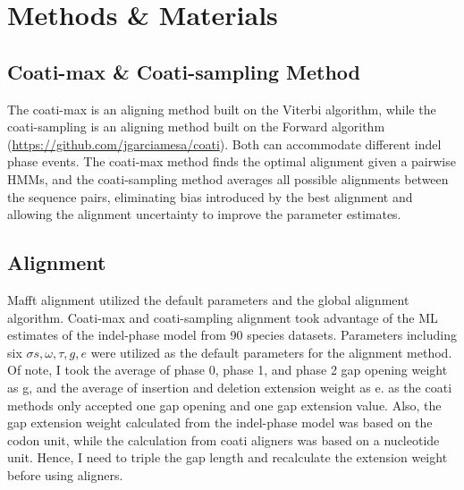 \section{Methods \& Materials}
\subsection{Coati-max \& Coati-sampling Method}
The coati-max is an aligning method built on the Viterbi algorithm, while the coati-sampling is an aligning method built on the Forward algorithm (\href{https://github.com/jgarciamesa/coati}{https://github.com/jgarciamesa/coati}). Both can accommodate different indel phase events. The coati-max method finds the optimal alignment given a pairwise HMMs, and the coati-sampling method averages all possible alignments between the sequence pairs, eliminating bias introduced by the best alignment and allowing the alignment uncertainty to improve the parameter estimates.  

\subsection{Alignment}
Mafft alignment utilized the default parameters and the global alignment algorithm. Coati-max and coati-sampling alignment took advantage of the ML estimates of the indel-phase model from 90 species datasets. Parameters including six $\sigma s, \omega, \tau, g, e$ were utilized as the default parameters for the alignment method. Of note, I took the average of phase 0, phase 1, and phase 2 gap opening weight as g, and the average of insertion and deletion extension weight as e. as the coati methods only accepted one gap opening and one gap extension value. Also, the gap extension weight calculated from the indel-phase model was based on the codon unit, while the calculation from coati aligners was based on a nucleotide unit. Hence, I need to triple the gap length and recalculate the extension weight before using aligners.   

